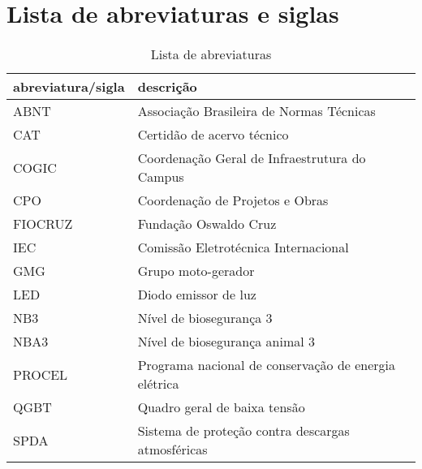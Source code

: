 \section*{Lista de abreviaturas e siglas} \label{section: abbreviations}

\begin{table}[ht]
	\centering
	\caption{Lista de abreviaturas}
	\begin{tabular}[t]
		{m{}m{}}
		\toprule
		\textbf{abreviatura/sigla}&\textbf{descrição}\\
		\midrule
		ABNT & Associação Brasileira de Normas Técnicas\\
		CAT & Certidão de acervo técnico\\
		COGIC & Coordenação Geral de Infraestrutura do Campus\\
		CPO & Coordenação de Projetos e Obras\\
		FIOCRUZ & Fundação Oswaldo Cruz\\
		IEC & Comissão Eletrotécnica Internacional\\
		GMG & Grupo moto-gerador \\
		LED & Diodo emissor de luz \\
		NB3 & Nível de biosegurança 3\\
		NBA3 & Nível de biosegurança animal 3\\
		PROCEL & Programa nacional de conservação de energia elétrica\\
		QGBT & Quadro geral de baixa tensão\\
		SPDA & Sistema de proteção contra descargas atmosféricas\\
		\bottomrule
	\end{tabular}
\end{table}